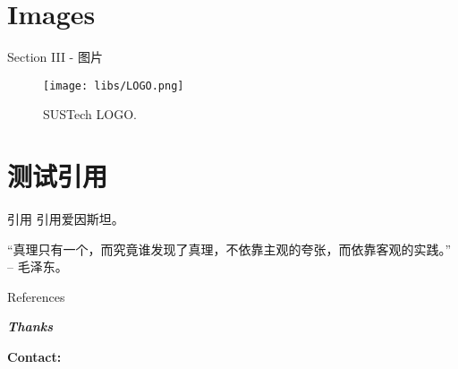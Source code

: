 \documentclass[compress, 10pt]{ctexbeamer}
\begin{document}
\section{Images}
\begin{frame}{Section III - 图片}
    \begin{figure}
        \centering
        \caption{SUSTech LOGO.}
        \texttt{[image: libs/LOGO.png]}
        \label{fig:ufc_emblem}
    \end{figure}
\end{frame}

\section{测试引用}
\begin{frame}{引用}
    引用爱因斯坦\cite{einstein}。
    
    “真理只有一个，而究竟谁发现了真理，不依靠主观的夸张，而依靠客观的实践。” -- 毛泽东\cite{毛泽东1949新民主主义论}。
\end{frame}

\begin{frame}[allowframebreaks]{References}
    \printbibliography
\end{frame}


{
    \begin{frame}
        \centering
        {\Huge \bfseries \emph{Thanks}}
        \vspace{1cm}

        {\Large \bfseries Contact:}

        \vspace{0.5cm}
        {\large \bfseries {}}
    \end{frame}
}
\end{document}

